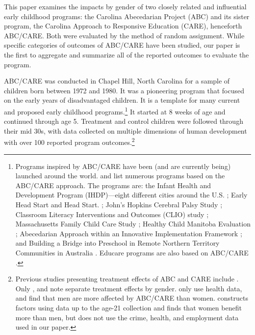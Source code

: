 This paper examines the impacts by gender of two closely related and influential early childhood programs: the Carolina Abecedarian Project (ABC) and its sister program, the Carolina Approach to Responsive Education (CARE), henceforth ABC/CARE. Both were evaluated by the method of random assignment. While specific categories of outcomes of ABC/CARE have been studied, our paper is the first to aggregate and summarize all of the reported outcomes to evaluate the program.

ABC/CARE was conducted in Chapel Hill, North Carolina for a sample of children born between 1972 and 1980. It was a pioneering program that focused on the early years of disadvantaged children. It is a template for many current and proposed early childhood programs.\footnote{Programs inspired by ABC/CARE have been (and are currently being) launched around the world. \citet{Sparling_2010_Highlights} and \citet{Ramey_Ramey_Lanzi_2014_Interventions} list numerous programs based on the ABC/CARE approach. The programs are: the Infant Health and Development Program (IHDP)---eight different cities around the U.S. \citep{Spiker-etal_1997_Helping}; Early Head Start and Head Start. \citep{Schneider_McDonald-eds_2007_Scale-Up_Vol-1}; John's Hopkins Cerebral Palsy Study \citep{Sparling_2010_Highlights}; Classroom Literacy Interventions and Outcomes (CLIO) study \citep{Sparling_2010_Highlights}; Massachusetts Family Child Care Study \citep{Collins_etal_2010_Massachusetts-Study}; Healthy Child Manitoba Evaluation \citep{Healthy_Child_Manitoba_2015_Starting-Early}; Abecedarian Approach within an Innovative Implementation Framework \citep{Jensen_Nielsen_2016_ABC-Programme-Pilot}; and Building a Bridge into Preschool in Remote Northern Territory Communities in Australia \citep{UMonash_Dataset_2015_URL}. Educare programs are also based on ABC/CARE \citep{Educare_2014_Research_Agenda,Yazejian_Bryant_2012_Educare}.} It started at 8 weeks of age and continued through age 5. Treatment and control children were followed through their mid 30s, with data collected on multiple dimensions of human development with over 100 reported program outcomes.\footnote{Previous studies presenting treatment effects of ABC and CARE include \citet{Ramey_etal_1985_Project-CARE_TiECSE,Clarke_Campbell_1998_ABC_Comparison_ECRQ,Campbell_Pungello_etal_2001_DP,Campbell_Ramey_etal_2002_ADS,Anderson_2008_JASA,Campbell_Wasik_etal_2008_ECRQ,Campbell_Conti_etal_2014_EarlyChildhoodInvestments}. Only \citet{Heckman_2006_Science}, \citet{Anderson_2008_JASA} and \citet{Campbell_Conti_etal_2014_EarlyChildhoodInvestments} note separate treatment effects by gender. \citet{Campbell_Conti_etal_2014_EarlyChildhoodInvestments} only use health data, and find that men are more affected by ABC/CARE than women. \citet{Anderson_2008_JASA} constructs factors using data up to the age-21 collection and finds that women benefit more than men, but does not use the crime, health, and employment data used in our paper. }

